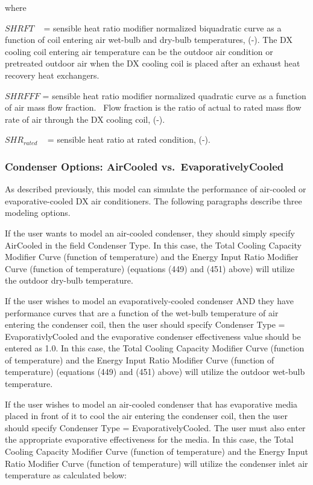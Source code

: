 where

\(SHRFT\) ~ = sensible heat ratio modifier normalized biquadratic curve as a function of coil entering air wet-bulb and dry-bulb temperatures, (-). The DX cooling coil entering air temperature can be the outdoor air condition or pretreated outdoor air when the DX cooling coil is placed after an exhaust heat recovery heat exchangers.

\(SHRFFF\) = sensible heat ratio modifier normalized quadratic curve as a function of air mass flow fraction.~ Flow fraction is the ratio of actual to rated mass flow rate of air through the DX cooling coil, (-).

\(SH{R_{rated}}\) ~ = sensible heat ratio at rated condition, (-).

\subsubsection{Condenser Options: AirCooled vs.~EvaporativelyCooled}\label{condenser-options-aircooled-vs.evaporativelycooled}

As described previously, this model can simulate the performance of air-cooled or evaporative-cooled DX air conditioners. The following paragraphs describe three modeling options.

If the user wants to model an air-cooled condenser, they should simply specify AirCooled in the field Condenser Type. In this case, the Total Cooling Capacity Modifier Curve (function of temperature) and the Energy Input Ratio Modifier Curve (function of temperature) (equations (449) and (451) above) will utilize the outdoor dry-bulb temperature.

If the user wishes to model an evaporatively-cooled condenser AND they have performance curves that are a function of the wet-bulb temperature of air entering the condenser coil, then the user should specify Condenser Type = EvaporativlyCooled and the evaporative condenser effectiveness value should be entered as 1.0. In this case, the Total Cooling Capacity Modifier Curve (function of temperature) and the Energy Input Ratio Modifier Curve (function of temperature) (equations (449) and (451) above) will utilize the outdoor wet-bulb temperature.

If the user wishes to model an air-cooled condenser that has evaporative media placed in front of it to cool the air entering the condenser coil, then the user should specify Condenser Type = EvaporativelyCooled. The user must also enter the appropriate evaporative effectiveness for the media. In this case, the Total Cooling Capacity Modifier Curve (function of temperature) and the Energy Input Ratio Modifier Curve (function of temperature) will utilize the condenser inlet air temperature as calculated below:

